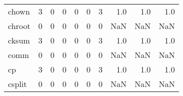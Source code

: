\begin{tabular}{lrrrrrrrrr}
chown     &                                       3 &                                                  0 &                                                  0 &                                                  0 &                                                  0 &                                                  3 &                                                1.0 &                                    1.0 &                                  1.0 \\
chroot    &                                       0 &                                                  0 &                                                  0 &                                                  0 &                                                  0 &                                                  0 &                                                NaN &                                    NaN &                                  NaN \\
cksum     &                                       3 &                                                  0 &                                                  0 &                                                  0 &                                                  0 &                                                  3 &                                                1.0 &                                    1.0 &                                  1.0 \\
comm      &                                       0 &                                                  0 &                                                  0 &                                                  0 &                                                  0 &                                                  0 &                                                NaN &                                    NaN &                                  NaN \\
cp        &                                       3 &                                                  0 &                                                  0 &                                                  0 &                                                  0 &                                                  3 &                                                1.0 &                                    1.0 &                                  1.0 \\
csplit    &                                       0 &                                                  0 &                                                  0 &                                                  0 &                                                  0 &                                                  0 &                                                NaN &                                    NaN &                                  NaN \\

\end{tabular}
